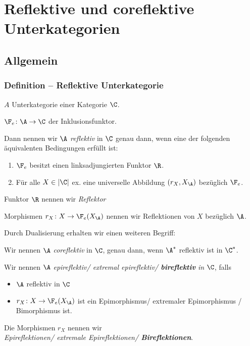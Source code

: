 \section{Reflektive und coreflektive Unterkategorien}

\subsection{Allgemein}

\begin{frame}
  \frametitle{Definition -- Reflektive Unterkategorie}
  $A$ Unterkategorie einer Kategorie $\C$.
  
  $\F_e \colon \A \to \C$ der Inklusionsfunktor.

  Dann nennen wir $\A$ \emph{reflektiv} in $\C$ genau dann, wenn eine der folgenden äquivalenten Bedingungen erfüllt ist:
  \begin{enumerate}[(1)]
    \item $\F_e$ besitzt einen linksadjungierten Funktor $\R$.
    \item Für alle $X \in |\C|$ ex. eine universelle Abbildung $(r_X, X_\A)$ bezüglich $\F_e$.
  \end{enumerate}

  \pause
  \vspace{1em}
  Funktor $\R$ nennen wir \emph{Reflektor}
  
  Morphismen $r_X \colon X \to \F_e(X_\A)$ nennen wir Reflektionen von $X$ bezüglich $\A$.

  \pause
  \vspace{1em}
  Durch Dualisierung erhalten wir einen weiteren Begriff:

  Wir nennen $\A$ \emph{coreflektiv} in $\C$, genau dann, wenn $\A^*$ reflektiv ist in $\C^*$. 

  \pause
  \vspace{1em}

  Wir nennen $\A$ \emph{epireflektiv/ extremal epireflektiv/ \textbf{bireflektiv} in} $\C$, falls 
  \pause
  \begin{itemize}
    \item  $\A$ reflektiv in $\C$
    \item  $r_X \colon X \to \F_e(X_\A)$ ist ein Epimorphismus/ extremaler Epimorphismus / Bimorphismus ist.
  \end{itemize}
   
  Die Morphismen $r_X$ nennen wir \\\emph{Epireflektionen/ extremale Epireflektionen/ \textbf{Bireflektionen}}.
\end{frame}

